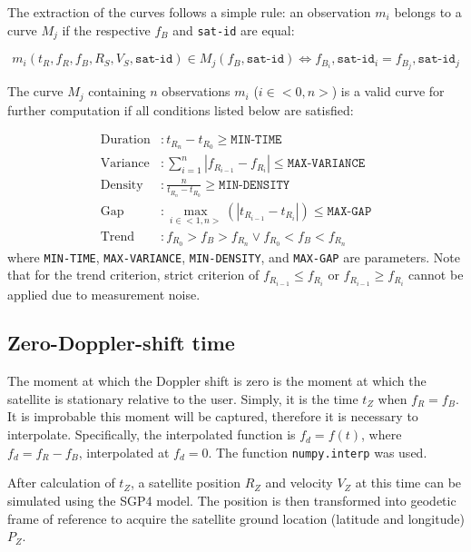 The extraction of the curves follows a simple rule: an observation $m_i$ belongs to a curve $M_j$ if the respective $f_B$ and \texttt{sat-id} are equal:

\begin{equation*}
    m_i(t_R, f_R, f_B, R_S, V_S, \texttt{sat-id}) \in M_j(f_B, \texttt{sat-id}) \Leftrightarrow f_{B_i}, \texttt{sat-id}_i = f_{B_j}, \texttt{sat-id}_j
\end{equation*}

The curve $M_j$ containing $n$ observations $m_i$ ($i \in <0, n>$) is a valid curve for further computation if all conditions listed below are satisfied:

\begin{align*}
    \text{Duration}&: t_{R_n} - t_{R_0} \geq \texttt{MIN-TIME} \\
    \text{Variance}&: \sum^n_{i=1} |f_{R_{i-1}} - f_{R_i}| \leq \texttt{MAX-VARIANCE} \\
    \text{Density}&: \frac{n}{t_{R_n} - t_{R_0}} \geq \texttt{MIN-DENSITY} \\
    \text{Gap}&: \max_{i \in <1, n>}(|t_{R_{i-1}} - t_{R_i}|) \leq \texttt{MAX-GAP} \\
    \text{Trend} &: f_{R_0} > f_B > f_{R_n} \lor f_{R_0} < f_B < f_{R_n}
\end{align*}
where \texttt{MIN-TIME}, \texttt{MAX-VARIANCE}, \texttt{MIN-DENSITY}, and \texttt{MAX-GAP} are parameters. Note that for the trend criterion, strict criterion of $f_{R_{i-1}} \leq f_{R_i}$ or $f_{R_{i-1}} \geq f_{R_i}$ cannot be applied due to measurement noise.


\subsection{Zero-Doppler-shift time}
The moment at which the Doppler shift is zero is the moment at which the satellite is stationary relative to the user. Simply, it is the time $t_Z$ when $f_R = f_B$. It is improbable this moment will be captured, therefore it is necessary to interpolate. Specifically, the interpolated function is $f_d = f(t)$, where $f_d = f_R - f_B$, interpolated at $f_d = 0$. The function \texttt{numpy.interp} was used.

After calculation of $t_Z$, a satellite position $R_Z$ and velocity $V_Z$ at this time can be simulated using the SGP4 model. The position is then transformed into geodetic frame of reference to acquire the satellite ground location (latitude and longitude) $P_Z$.

